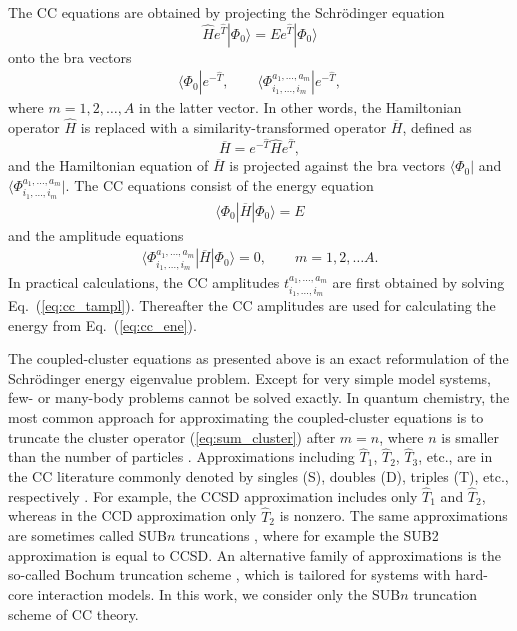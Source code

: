 \documentclass[a4paper,12pt]{report}
\begin{document}
The CC equations are obtained by projecting the Schr{\"o}dinger equation
\begin{equation}
  \hat{H}e^{\hat{T}}|\Phi_{0}\rangle = Ee^{\hat{T}}|\Phi_{0}\rangle
\end{equation}
onto the bra vectors 
\begin{align}
  \langle \Phi_{0}|e^{-\hat{T}}, \qquad \langle \Phi_{i_{1},\dots ,i_{m}}^{a_{1},\dots ,a_{m}}|e^{-\hat{T}},
\end{align}
where $m = 1, 2, \dots , A$ in the latter vector. In other words, the Hamiltonian operator $\hat{H}$ is replaced with a similarity-transformed operator $\overline{H}$, defined as
\begin{equation}
  \overline{H} = e^{-\hat{T}}\hat{H}e^{\hat{T}},
\end{equation}
and the Hamiltonian equation of $\overline{H}$ is projected against the bra vectors $\langle \Phi_{0}|$ and $\langle \Phi_{i_{1},\dots ,i_{m}}^{a_{1},\dots ,a_{m}}|$. The CC equations consist of the energy equation
\begin{align}
  \langle \Phi_{0}|\overline{H}|\Phi_{0}\rangle = E
  \label{eq:cc_ene}
\end{align} 
and the amplitude equations
\begin{align}
  \langle \Phi_{i_{1},\dots ,i_{m}}^{a_{1},\dots ,a_{m}}|\overline{H}|\Phi_{0}\rangle = 0, \qquad m = 1, 2, \dots A.
  \label{eq:cc_tampl}
\end{align}
In practical calculations, the CC amplitudes $t_{i_{1}, \dots , i_{m}}^{a_{1}, \dots , a_{m}}$ are first obtained by solving Eq.~(\ref{eq:cc_tampl}). Thereafter the CC amplitudes are used for calculating the energy from Eq.~(\ref{eq:cc_ene}).




The coupled-cluster equations as presented above is an exact reformulation of
the Schr{\"o}dinger energy eigenvalue problem. Except for very simple model 
systems, few- or many-body problems cannot be solved exactly. In quantum 
chemistry, the most common approach for approximating the coupled-cluster 
equations is to truncate the cluster operator (\ref{eq:sum_cluster}) after 
$m = n$, where $n$ is smaller than the number of particles 
\cite{crawford,bartlett_review}. Approximations including 
$\hat{T}_{1}$, $\hat{T}_{2}$, $\hat{T}_{3}$, etc., are in the CC literature 
commonly denoted by singles (S), doubles (D), triples (T), etc., 
respectively \cite{crawford}. For example, the CCSD approximation includes 
only $\hat{T}_{1}$ and $\hat{T}_{2}$, whereas in the CCD approximation only 
$\hat{T}_{2}$ is nonzero. The same approximations are sometimes called
SUB$n$ truncations \cite{bishop1978}, where for example the SUB2 approximation
is equal to CCSD. An alternative family of approximations is the so-called 
Bochum truncation scheme \cite{kummel1978}, which is tailored for systems
with hard-core interaction models. In this work, we consider only 
the SUB$n$ truncation scheme of CC theory. 
\end{document}
